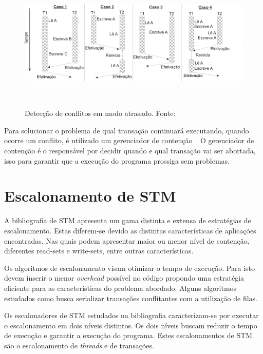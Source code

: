 \documentclass[ti]{texufpel} %
\begin{document}
\begin{figure}[!htp]
\centering
\includegraphics[height=6.5cm]{Imagens/conflitoatrasado.png}
\caption{Detecção de conflitos em modo atrasado. Fonte:~\cite{rigo07}}
\label{figuradeteccaoatrasado}
\end{figure}

Para solucionar o problema de qual transação continuará executando, quando ocorre um conflito, é utilizado um gerenciador de contenção~\cite{harris10}. O gerenciador de contenção é o responsável por decidir quando e qual transação vai ser abortada, isso para garantir que a execução do programa prossiga sem problemas.

\chapter{Escalonamento de STM}

  A bibliografia de STM apresenta um gama distinta e extensa de estratégias de escalonamento. Estas diferem-se devido as distintas características de aplicações encontradas. Nas quais podem apresentar maior ou menor nível de contenção, diferentes read-sets e write-sets, entre outras características.

  Os algoritmos de escalonamento visam otimizar o tempo de execução. Para isto devem inserir o menor \emph{overhead} possível no código propondo uma estratégia eficiente para as características do problema abordado. Alguns algoritmos estudados como  busca serializar transações conflitantes com a utilização de filas.

  Os escalonadores de STM estudados na bibliografia caracterizam-se por executar o escalonamento em dois níveis distintos. Os dois níveis buscam reduzir o tempo de execução e garantir a execução do programa. Estes escalonamentos de STM são o escalonamento de \emph{threads} e de transações.
\end{document}
